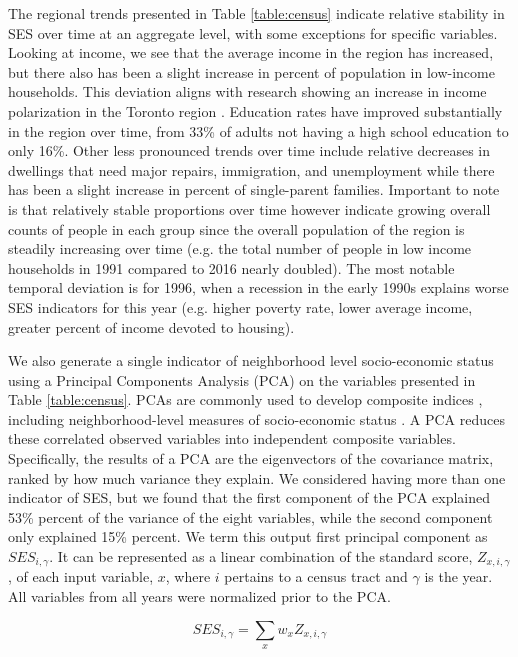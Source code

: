 The regional trends presented in Table \ref{table:census} indicate relative stability in SES over time at an aggregate level, with some exceptions for specific variables. Looking at income, we see that the average income in the region has increased, but there also has been a slight increase in percent of population in low-income households. This deviation aligns with research showing an increase in income polarization in the Toronto region \cite{hulchanski_three_2010}. Education rates have improved substantially in the region over time, from 33\% of adults not having a high school education to only 16\%. Other less pronounced trends over time include relative decreases in dwellings that need major repairs, immigration, and unemployment while there has been a slight increase in percent of single-parent families. Important to note is that relatively stable proportions over time however indicate growing overall counts of people in each group since the overall population of the region is steadily increasing over time (e.g. the total number of people in low income households in 1991 compared to 2016 nearly doubled). The most notable temporal deviation is for 1996, when a recession in the early 1990s explains worse SES indicators for this year (e.g. higher poverty rate, lower average income, greater percent of income devoted to housing).

We also generate a single indicator of neighborhood level socio-economic status using a Principal Components Analysis (PCA) on the variables presented in Table \ref{table:census}. PCAs are commonly used to develop composite indices \cite{oecd_handbook_2008}, including neighborhood-level measures of socio-economic status  \cite{pampalon_deprivation_2009,cabrera-barona_multiscale_2016}. A PCA reduces these correlated observed variables into independent composite variables. Specifically, the results of a PCA are the eigenvectors of the covariance matrix, ranked by how much variance they explain. We considered having more than one indicator of SES, but we found that the first component of the PCA explained 53\% percent of the variance of the eight variables, while the second component only explained 15\% percent. We term this output first principal component as $SES_{i,\gamma}$. It can be represented as a linear combination of the standard score, $Z_{x,i,\gamma}$, of each input variable, $x$, where $i$ pertains to a census tract and $\gamma$ is the year. All variables from all years were normalized prior to the PCA.


\begin{equation}
{SES}_{i,\gamma} = \sum_x w_x Z_{x,i,\gamma} 
\end{equation}

